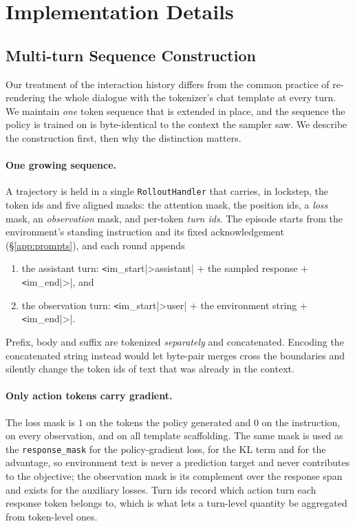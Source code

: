 
\section{Implementation Details}
\label{app:impl}

\subsection{Multi-turn Sequence Construction}
\label{app:seq}

Our treatment of the interaction history differs from the common practice of
re-rendering the whole dialogue with the tokenizer's chat template at every turn. We
maintain \emph{one} token sequence that is extended in place, and the sequence the
policy is trained on is byte-identical to the context the sampler saw. We describe the
construction first, then why the distinction matters.

\paragraph{One growing sequence.}
A trajectory is held in a single \texttt{RolloutHandler} that carries, in lockstep, the
token ids and five aligned masks: the attention mask, the position ids, a \emph{loss}
mask, an \emph{observation} mask, and per-token \emph{turn ids}. The episode starts from
the environment's standing instruction and its fixed acknowledgement
(\S\ref{app:prompts}), and each round appends
\begin{enumerate}[nosep]
  \item the assistant turn: \verb|<|im_start|>assistant\n| $+$ the sampled response $+$ \verb|<|im_end|>|, and
  \item the observation turn: \verb|<|im_start|>user\n| $+$ the environment string $+$ \verb|<|im_end|>|.
\end{enumerate}
Prefix, body and suffix are tokenized \emph{separately} and concatenated. Encoding the
concatenated string instead would let byte-pair merges cross the boundaries and silently
change the token ids of text that was already in the context.

\paragraph{Only action tokens carry gradient.}
The loss mask is $1$ on the tokens the policy generated and $0$ on the instruction, on
every observation, and on all template scaffolding. The same mask is used as the
\texttt{response\_mask} for the policy-gradient loss, for the KL term and for the
advantage, so environment text is never a prediction target and never contributes to the
objective; the observation mask is its complement over the response span and exists for
the auxiliary losses. Turn ids record which action turn each response token belongs to,
which is what lets a turn-level quantity be aggregated from token-level ones.

